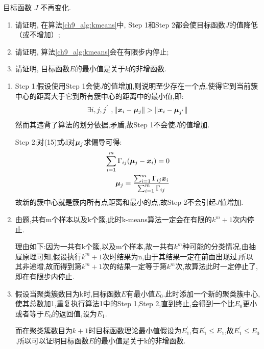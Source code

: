 \documentclass[answers]{exam}  %
\begin{document}
\begin{questions}
{\begin{algorithm}[ht]
\begin{algorithmic}[1]
{				\Until 目标函数 $J$ 不再变化.}
		\end{algorithmic}
	\end{algorithm}}
	\begin{enumerate}
		\item 请证明, 在算法\ref{ch9_alg:kmeans}中, Step 1和Step 2都会使目标函数$J$的值降低（或不增加）;
		\item 请证明, 算法\ref{ch9_alg:kmeans}会在有限步内停止;
		\item 请证明, 目标函数$E$的最小值是关于$k$的非增函数.
	\end{enumerate}


	\begin{solution}
		\begin{enumerate}
			\item Step 1:假设使用Step 1会使$J$的值增加,则说明至少存在一个点,使得它到当前簇中心的距离大于它到所有簇中心的距离中的最小值,即:
			      \begin{align*}
				      \exists i,j,j^{'}\ , \|{\boldsymbol{x}}_i-\boldsymbol{\mu}_j\| > \|{\boldsymbol{x}}_i-\boldsymbol{\mu}_{j^{'}}\|
			      \end{align*}
			      然而其违背了算法的划分依据,矛盾,故Step 1不会使$J$的值增加.

			      Step 2:对(15)式d对$\boldsymbol{\mu}_j$求偏导可得:
			      \begin{align*}
				      \sum_{i=1}^{m}\Gamma_{ij}(\boldsymbol{\mu}_j-{\boldsymbol{x}}_i)=0 \\
				      \boldsymbol{\mu}_j=\frac{\sum_{i=1}^{m}\Gamma_{ij}{\boldsymbol{x}}_i}{\sum_{i=1}^{m}\Gamma_{ij}}
			      \end{align*}
			      故新的簇中心就是簇内所有点距离和最小的点,故Step 2不会引起$J$值增加.
			\item 由题,共有m个样本以及k个簇,此时k-means算法一定会在有限的$k^m+1$次内停止.

			      理由如下:因为一共有k个簇,以及m个样本,故一共有$k^m$种可能的分类情况,由抽屉原理可知,假设执行$k^m+1$次时结果为n,由于其结果一定在前面出现过,所以其非递增,故而得到第$k^m+1$次的结果一定等于第$k^m$次,故算法此时一定停止了,即在有限步内停止.
			\item 假设当聚类簇数目为k时,目标函数$E$有最小值$E_0$.此时添加一个新的聚类簇中心,使其总数加1,重复执行算法1中的Step 1,Step 2,直到终止,会得到一个比$E_0$更小或者等于$E_0$的返回值,设为$E_1$.

			      而在聚类簇数目为$k+1$时目标函数理论最小值假设为$E_1^{'}$,有$E_1^{'}\leq E_1$,故$E_1^{'}\leq E_0$.所以可以证明目标函数$E$的最小值是关于k的非增函数.
		\end{enumerate}
	\end{solution}

\end{questions}
\end{document}
